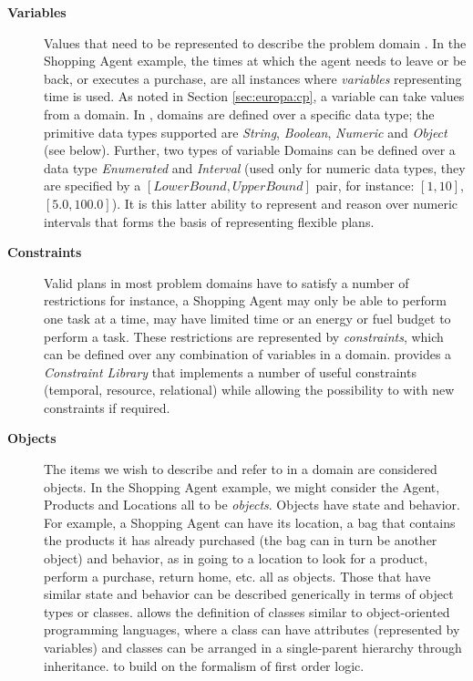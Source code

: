 \begin{description}

\item[\textbf{Variables}] Values that need to be represented to
  describe the problem domain .  In the Shopping Agent example, the times at which the
  agent needs to leave or be back, or executes a purchase, are all
  instances where \emph{variables} representing time is used.  As
  noted in Section \ref{sec:europa:cp}, a variable can take values
  from a domain. In \eue, domains are defined over a specific data
  type; the primitive data types supported are \textit{String},
  \textit{Boolean}, \textit{Numeric} and \textit{Object} (see
  below). Further, two types of variable Domains can be defined over a
  data type \textit{Enumerated} and \textit{Interval} (used only for
  numeric data types, they are specified by a
  $[LowerBound,UpperBound]$ pair, for instance: $[1,10]$,
  $[5.0,100.0]$). It is this latter ability to represent and reason
  over numeric intervals that forms the basis of representing flexible
  plans.

\item[\textbf{Constraints}] Valid plans in most problem domains have
  to satisfy a number of restrictions for instance, a Shopping Agent
  may only be able to perform one task at a time, may have limited
  time or an energy or fuel budget to perform a task. These
  restrictions are represented by \emph{constraints}, which can be
  defined over any combination of variables in a domain. \eu provides
  a \emph{Constraint Library} that implements a number of useful
  constraints (temporal, resource, relational) while allowing the
  possibility to  with new constraints if required.

\item[\textbf{Objects}] The items we wish to describe and refer to in
  a domain are considered objects.  In the Shopping Agent example, we
  might consider the Agent, Products and Locations all to be
  \emph{objects}. Objects have state and behavior.  For example, a
  Shopping Agent can have its location, a bag that contains the
  products it has already purchased (the bag can in turn be another
  object) and behavior, as in going to a location to look for a
  product, perform a purchase, return home, etc. all as objects.
  Those that have similar state and behavior can be described
  generically in terms of object types or classes. \eu allows the
  definition of classes similar to object-oriented programming
  languages, where a class can have attributes (represented by
  variables) and classes can be arranged in a single-parent hierarchy
  through inheritance.   to build on
  the formalism of first order logic.


\end{description}

